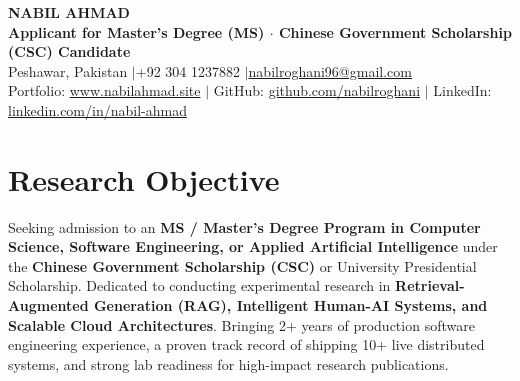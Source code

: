 \documentclass[10pt,a4paper]{article}
\begin{document}
\pagestyle{empty}

\begin{center}
    {\Huge \textbf{NABIL AHMAD}} \\[4pt]
    \textbf{Applicant for Master's Degree (MS) $\cdot$ Chinese Government Scholarship (CSC) Candidate} \\[3pt]
    Peshawar, Pakistan \quad$|$\quad +92 304 1237882 \quad$|$\quad \href{mailto:nabilroghani96@gmail.com}{nabilroghani96@gmail.com} \\[2pt]
    Portfolio: \href{https://www.nabilahmad.site}{www.nabilahmad.site} \quad$|$\quad
    GitHub: \href{https://github.com/nabilroghani}{github.com/nabilroghani} \quad$|$\quad
    LinkedIn: \href{https://linkedin.com/in/nabil-ahmad-0750002b1}{linkedin.com/in/nabil-ahmad}
\end{center}

\section{Research Objective}
Seeking admission to an \textbf{MS / Master’s Degree Program in Computer Science, Software Engineering, or Applied Artificial Intelligence} under the \textbf{Chinese Government Scholarship (CSC)} or University Presidential Scholarship. Dedicated to conducting experimental research in \textbf{Retrieval-Augmented Generation (RAG), Intelligent Human-AI Systems, and Scalable Cloud Architectures}. Bringing 2+ years of production software engineering experience, a proven track record of shipping 10+ live distributed systems, and strong lab readiness for high-impact research publications.

\end{document}
